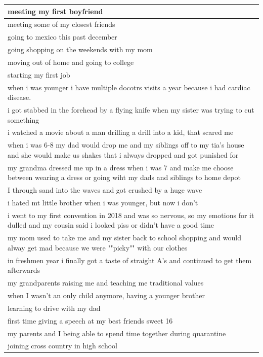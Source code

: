 \documentclass[
  .7em,
  letterpaper,
  DIV=11,
  numbers=noendperiod]{scrartcl}
\begin{document}
\begin{table}
\begin{tabular}{l}
\hline
meeting my first boyfriend\\
\hline
meeting some of my closest friends\\
\hline
going to mexico this past december\\
\hline
going shopping on the weekends with my mom\\
\hline
moving out of home and going to college\\
\hline
starting my first job\\
\hline
when i was younger i have multiple docotrs visits a year because i had cardiac disease.\\
\hline
i got stabbed in the forehead by a flying knife when my sister was trying to cut something\\
\hline
i watched a movie about a man drilling a drill into a kid, that scared me\\
\hline
when i was 6-8 my dad would drop me and my siblings off to my tia's house and she would make us shakes that i always dropped and got punished for\\
\hline
my grandma dressed me up in a dress when i was 7 and make me choose between wearing a dress or going wiht my dads and siblings to home depot\\
\hline
I through sand into the waves and got crushed by a huge wave\\
\hline
i hated mt little brother when i was younger, but now i don't\\
\hline
i went to my first convention in 2018 and was so nervous, so my emotions for it dulled and my cousin said i looked piss or didn't have a good time\\
\hline
my mom used to take me and my sister back to school shopping and would alway get mad because we were ""picky"" with our clothes\\
\hline
in freshmen year i finally got a taste of straight A's and continued to get them afterwards\\
\hline
my grandparents raising me and teaching me traditional values\\
\hline
when I wasn't an only child anymore, having a younger brother\\
\hline
learning to drive with my dad\\
\hline
first time giving a speech at my best friends sweet 16\\
\hline
my parents and I being able to spend time together during quarantine\\
\hline
joining cross country in high school\\

\end{tabular}
\end{table}
\end{document}
